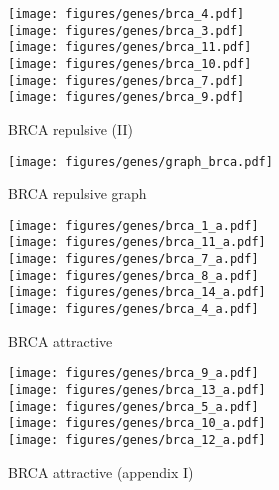\begin{figure}[htb]
\centering
\texttt{[image: figures/genes/brca\_4.pdf]}\\[2em]
\texttt{[image: figures/genes/brca\_3.pdf]}\\[2em]
\texttt{[image: figures/genes/brca\_11.pdf]}\\[2em]
\texttt{[image: figures/genes/brca\_10.pdf]}\\[2em]
\texttt{[image: figures/genes/brca\_7.pdf]}\\[2em]
\texttt{[image: figures/genes/brca\_9.pdf]}\\[2em]
\caption{BRCA repulsive (II)}
\end{figure}

\begin{figure}[htb]
\texttt{[image: figures/genes/graph\_brca.pdf]}\\[2em]
\caption{BRCA repulsive graph}
\end{figure}

\begin{figure}[htb]
\centering
\texttt{[image: figures/genes/brca\_1\_a.pdf]}\\[2em]
\texttt{[image: figures/genes/brca\_11\_a.pdf]}\\[2em]
\texttt{[image: figures/genes/brca\_7\_a.pdf]}\\[2em]
\texttt{[image: figures/genes/brca\_8\_a.pdf]}\\[2em]
\texttt{[image: figures/genes/brca\_14\_a.pdf]}\\[2em]
\texttt{[image: figures/genes/brca\_4\_a.pdf]}\\[2em]
\caption{BRCA attractive}
\end{figure}

\begin{figure}[htb]
\centering
\texttt{[image: figures/genes/brca\_9\_a.pdf]}\\[2em]
\texttt{[image: figures/genes/brca\_13\_a.pdf]}\\[2em]
\texttt{[image: figures/genes/brca\_5\_a.pdf]}\\[2em]
\texttt{[image: figures/genes/brca\_10\_a.pdf]}\\[2em]
\texttt{[image: figures/genes/brca\_12\_a.pdf]}\\[2em]
\caption{BRCA attractive (appendix I)}
\end{figure}

